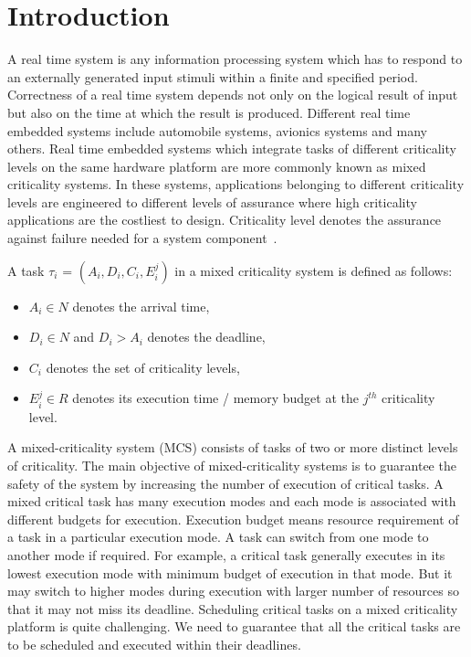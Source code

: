 \chapter{Introduction}\label{ch1}
\noindent
A real time system is any information processing system which has to respond to an externally generated input stimuli within 
a finite and specified period. Correctness of a real time system depends not only on the logical result of input but also on 
the time at which the result is produced. Different real time embedded systems include automobile systems, avionics systems 
and many others. Real time embedded systems which integrate tasks of different criticality levels on the same hardware 
platform are more commonly known as mixed criticality systems. In these systems, applications belonging to different 
criticality levels are engineered to different levels of assurance where high criticality applications are the 
costliest to design. Criticality level denotes the assurance against failure needed for a system component~\cite{burns2013mixed}.

\noindent
A task $\tau_{i}$ = $(A_{i}, D_{i}, C_{i}, E^{j}_{i})$ in a mixed criticality system is defined as 
follows:
\begin{itemize}
\item $A_{i} \in N$ denotes the arrival time,
\item $D_{i} \in N$ and $D_{i} > A_{i}$ denotes the deadline,
\item $C_{i}$ denotes the set of criticality levels,
\item $E^{j}_{i} \in R$ denotes its execution time / memory budget at the $j^{th}$ criticality level.
\end{itemize}

\noindent
A mixed-criticality system (MCS) consists of tasks of two or more distinct levels of criticality. The main objective of 
mixed-criticality systems is to guarantee the safety of the system by increasing the number of execution of critical tasks. 
A mixed 
critical task has many execution modes and each mode is associated with different budgets for execution. Execution budget 
means resource requirement of a task in a particular execution mode. A task can switch from one mode to another mode 
if required. For example, a critical task generally executes in its lowest execution mode with minimum budget of execution in 
that mode. But it may switch to higher modes during execution with larger number of resources so that it may not miss its 
deadline. Scheduling critical tasks on a mixed criticality platform is quite challenging. We need to guarantee that all the 
critical tasks are to be scheduled and executed within their deadlines. 

